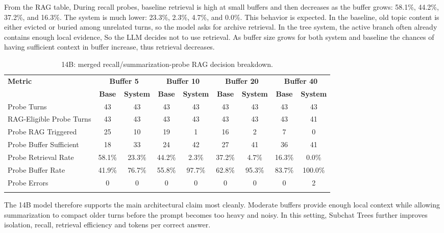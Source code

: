 From the RAG table, During recall probes, baseline retrieval is high at small buffers and then decreases as the buffer grows: 58.1\%, 44.2\%, 37.2\%, and 16.3\%. The system is much lower: 23.3\%, 2.3\%, 4.7\%, and 0.0\%. This behavior is expected. In the baseline, old topic content is either evicted or buried among unrelated turns, so the model asks for archive retrieval. In the tree system, the active branch often already contains enough local evidence, So the LLM decides not to use retrieval. As buffer size grows for both system and baseline the chances of having sufficient context in buffer increase, thus retrieval decreases.

\begin{table}[htbp]
\caption{14B: merged recall/summarization-probe RAG decision breakdown.}\label{tab:14b_rag_main}
\centering
\tiny
\setlength{\tabcolsep}{2.2pt}
\begin{adjustbox}{width=\textwidth}
\begin{tabular}{lcccccccc}
\toprule
\textbf{Metric} & \multicolumn{2}{c}{\textbf{Buffer 5}} & \multicolumn{2}{c}{\textbf{Buffer 10}} & \multicolumn{2}{c}{\textbf{Buffer 20}} & \multicolumn{2}{c}{\textbf{Buffer 40}} \\
\cmidrule(lr){2-3}\cmidrule(lr){4-5}\cmidrule(lr){6-7}\cmidrule(lr){8-9}
 & \textbf{Base} & \textbf{System} & \textbf{Base} & \textbf{System} & \textbf{Base} & \textbf{System} & \textbf{Base} & \textbf{System} \\
\midrule
Probe Turns & 43 & 43 & 43 & 43 & 43 & 43 & 43 & 43 \\
RAG-Eligible Probe Turns & 43 & 43 & 43 & 43 & 43 & 43 & 43 & 41 \\
Probe RAG Triggered & 25 & 10 & 19 & 1 & 16 & 2 & 7 & 0 \\
Probe Buffer Sufficient & 18 & 33 & 24 & 42 & 27 & 41 & 36 & 41 \\
Probe Retrieval Rate & 58.1\% & 23.3\% & 44.2\% & 2.3\% & 37.2\% & 4.7\% & 16.3\% & 0.0\% \\
Probe Buffer Rate & 41.9\% & 76.7\% & 55.8\% & 97.7\% & 62.8\% & 95.3\% & 83.7\% & 100.0\% \\
Probe Errors & 0 & 0 & 0 & 0 & 0 & 0 & 0 & 2 \\
\botrule
\end{tabular}
\end{adjustbox}
\end{table}

The 14B model therefore supports the main architectural claim most cleanly. Moderate buffers provide enough local context while allowing summarization to compact older turns before the prompt becomes too heavy and noisy. In this setting, Subchat Trees further improves isolation, recall, retrieval efficiency and tokens per correct answer.

